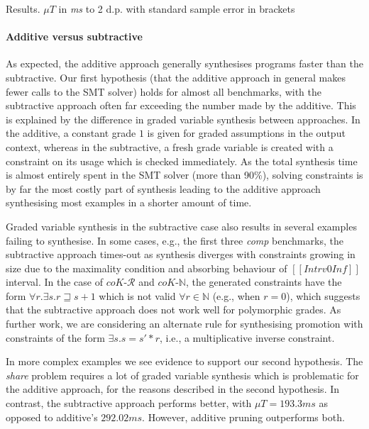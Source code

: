\begin{table}[t]
\caption{Results. $\mu{T}$ in \emph{ms} to 2 d.p.
with standard sample error in brackets}
\label{tab:results}
\vspace{-2.5em}
\end{table}



\paragraph{Additive versus subtractive}
As expected, the additive approach generally synthesises programs faster
than the subtractive. Our first hypothesis (that the additive approach in general
makes fewer calls to the SMT solver) holds for almost all benchmarks, with the
subtractive approach often far exceeding the number made by the additive. This is explained by
the difference in graded variable synthesis between approaches. In the
additive, a constant grade $1$ is given for graded assumptions in the output
context, whereas in the subtractive, a fresh grade
variable is created with a constraint on its usage which
is checked immediately. As the
total synthesis time is almost entirely spent in the SMT solver (more than 90\%), solving constraints is by far the most costly part of synthesis
leading to the additive approach synthesising most examples in a shorter amount of time.

Graded variable synthesis in the subtractive case also results
in several examples failing to synthesise. In some cases, e.g.,
the first three \textit{comp} benchmarks, the subtractive approach
times-out as synthesis diverges with constraints growing in size
due to the maximality condition and absorbing behaviour of
$[[ Intrv 0 Inf ]]$ interval. In the case of $\textit{coK-$\mathcal{R}$}$
and $\textit{coK-$\mathbb{N}$}$, the generated constraints
have the form $\forall r. \exists s. r \sqsupseteq s + 1 $ which
is not valid $\forall r \in \mathbb{N}$ (e.g., when $r = 0$),
which suggests that the subtractive approach does not work well for
polymorphic grades. As further work, we are
considering an alternate rule for synthesising promotion with
constraints of the form $\exists s . s = s' * r$, i.e.,
a multiplicative inverse constraint.

In more complex examples we see evidence to support
our second hypothesis. The \textit{share} problem requires a lot
of graded variable synthesis which is problematic for the additive
approach, for the reasons described in the second hypothesis. In contrast, the subtractive approach
performs better, with $\mu{T} = 193.3\textit{ms}$ as opposed to additive's
$292.02\textit{ms}$. However, additive pruning outperforms both.

